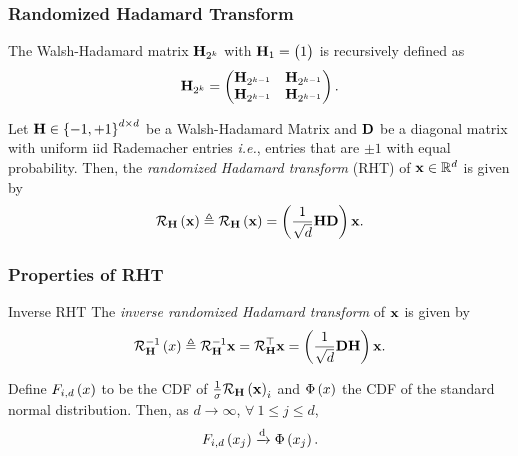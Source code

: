 \documentclass{beamer}
\begin{document}
    \begin{frame}
        \frametitle{Randomized Hadamard Transform}
        \begin{definition}
            The Walsh-Hadamard matrix \(\boldsymbol{\mathbf{H}}_{2^k}\) with \(\boldsymbol{\mathbf{H}}_1 = 
            \begin{pmatrix}1\end{pmatrix}\) is recursively defined as
            \begin{equation}
                \boldsymbol{\mathbf{H}}_{2^k} = \begin{pmatrix}\boldsymbol{\mathbf{H}}_{2^{k-1}} & \boldsymbol{\mathbf{H}}_{2^{k-1}} \\ \boldsymbol{\mathbf{H}}_{2^{k-1}} & \boldsymbol{\mathbf{H}}_{2^{k-1}}\end{pmatrix}.
                \label{eq:Hl-def}
            \end{equation}
        \end{definition}
        \begin{definition}
            Let \(\boldsymbol{\mathbf{H}}\in\left\{-1,+1\right\}^{d\times d}\) be a Walsh-Hadamard 
            Matrix and \(\boldsymbol{\mathbf{D}}\) be a diagonal matrix with uniform iid 
            Rademacher entries \emph{i.e.}, entries that are \(\pm 1\) with 
            equal probability. Then, the \emph{randomized Hadamard transform} 
            (RHT) of \(\boldsymbol{\mathbf{x}}\in\mathbb R^d\) is given by
            \begin{equation}
                \mathcal R_{\boldsymbol{\mathbf{H}}}\left(\boldsymbol{\mathbf{x}}\right) \triangleq \mathcal R_{\boldsymbol{\mathbf{H}}}\left(\boldsymbol{\mathbf{x}}\right) = \left(\frac{1}{\sqrt{d}}\boldsymbol{\mathbf{HD}}\right)\boldsymbol{\mathbf{x}}.
                \label{eq:rht-def}
            \end{equation}
        \end{definition}
    \end{frame}

    \begin{frame}
        \frametitle{Properties of RHT}
        \begin{definition}{Inverse RHT}
            The \emph{inverse randomized Hadamard transform} of \(\boldsymbol{\mathbf{x}}\) is given by
            \begin{equation}
                \mathcal R_{\boldsymbol{\mathbf{H}}}^{-1}\left(x\right) \triangleq \mathcal R_{\boldsymbol{\mathbf{H}}}^{-1}\boldsymbol{\mathbf{x}} = \mathcal R_{\boldsymbol{\mathbf{H}}}^\top\boldsymbol{\mathbf{x}} = \left(\frac{1}{\sqrt{d}}\boldsymbol{\mathbf{DH}}\right)\boldsymbol{\mathbf{x}}.
                \label{eq:inv-rht-def}
            \end{equation}
        \end{definition}
        \begin{lemma}
            Define \(F_{i,d}\left(x\right)\) to be the CDF of 
            \(\frac{1}{\sigma}\mathcal R_{\boldsymbol{\mathbf{H}}}\left(\boldsymbol{\mathbf{x}}\right)_i\) and 
            \(\Phi\left(x\right)\) the CDF of the standard normal distribution.
            Then, as \(d\to\infty\), \(\forall\ 1 \le j \le d\), 
            \begin{equation}
                F_{i,d}\left(x_j\right) \xrightarrow{\mathrm{d}} \Phi\left(x_j\right).
                \label{eq:rht-norm-conv}
            \end{equation}
        \end{lemma}
    \end{frame}
\end{document}

